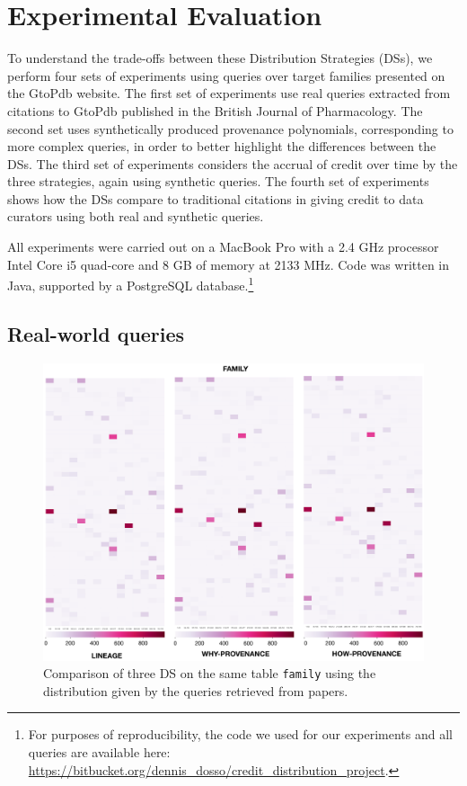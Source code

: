 \section{Experimental Evaluation}
\label{sec:experiments}
To understand the trade-offs between these Distribution Strategies (DSs), we perform four sets of experiments using queries over target families presented on the GtoPdb website. The first set of experiments use real queries extracted from citations to GtoPdb published in the British Journal of Pharmacology.  
The second set uses synthetically produced provenance polynomials, corresponding to more complex queries, in order to better highlight the differences between the DSs.
The third set of experiments considers the accrual of credit over time by the three strategies, again using synthetic queries.
The fourth set of experiments shows how the DSs compare to traditional citations in giving credit to data curators using both real and synthetic queries.

All experiments were carried out on a MacBook Pro %
with a 2.4 GHz processor Intel Core i5 quad-core and 8 GB of memory at 2133 MHz.  Code was written in Java, supported by a PostgreSQL database.\footnote{For purposes of reproducibility, the code we used for our experiments and all queries are available here: \url{https://bitbucket.org/dennis_dosso/credit_distribution_project}.}

\subsection{Real-world queries}
\label{sec:real_world_queries}

\begin{figure}[t]
  \includegraphics[width=1\textwidth]{figures/paper_based}
  \caption{Comparison of three DS on the same table \texttt{family} using the distribution given by the queries retrieved from papers.}
  \label{figure:comparison_on_papers}
\end{figure}


